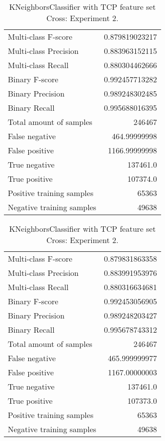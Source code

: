 \begin{table}[H]
\begin{minipage}{0.5\textwidth}
\caption{KNeighborsClassifier with TCP feature set Cross: Experiment 1.}
\centering
\begin{tabular}{l r}
\toprule
Multi-class F-score & 0.879819023217 \\
Multi-class Precision & 0.883963152115 \\
Multi-class Recall & 0.880304462666 \\
\midrule
Binary F-score & 0.992457713282 \\
Binary Precision & 0.989248302485 \\
Binary Recall & 0.995688016395 \\
\midrule
Total amount of samples & 246467 \\
False negative & 464.99999998 \\
False positive & 1166.99999998 \\
True negative & 137461.0 \\
True positive & 107374.0 \\
\midrule
Positive training samples & 65363 \\
Negative training samples & 49638 \\
\bottomrule
\end{tabular}
\end{minipage}
\hfillx
\begin{minipage}{0.5\textwidth}
\caption{KNeighborsClassifier with TCP feature set Cross: Experiment 2.}
\centering
\begin{tabular}{l r}
\toprule
Multi-class F-score & 0.879831863358 \\
Multi-class Precision & 0.883991953976 \\
Multi-class Recall & 0.880316634681 \\
\midrule
Binary F-score & 0.992453056905 \\
Binary Precision & 0.989248203427 \\
Binary Recall & 0.995678743312 \\
\midrule
Total amount of samples & 246467 \\
False negative & 465.999999977 \\
False positive & 1167.00000003 \\
True negative & 137461.0 \\
True positive & 107373.0 \\
\midrule
Positive training samples & 65363 \\
Negative training samples & 49638 \\
\bottomrule
\end{tabular}
\end{minipage}
\end{table}
